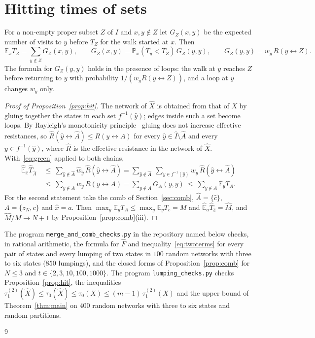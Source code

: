 \documentclass[11pt]{amsart}
\theoremstyle{definition}
\newcommand{\Prob}{\mathbb{P}}
\newcommand{\E}{\mathbb{E}}
\newcommand{\tmix}{\tau_1^{(2)}}
\newcommand{\hE}{\widehat{\E}}
\newcommand{\hw}{\widehat{w}}
\newcommand{\hI}{\widehat{I}}
\newcommand{\hA}{\widehat{A}}
\newcommand{\hX}{\widehat{X}}
\newcommand{\hM}{\widehat{M}}
\newcommand{\hF}{\widehat{F}}
\newcommand{\lra}{\leftrightarrow}
\begin{document}
\section{Hitting times of sets}\label{sec:hit}
For a non-empty proper subset $Z$ of $I$ and $x,y\notin Z$ let $G_Z(x,y)$ be the expected number of visits to $y$
before $T_Z$ for the walk started at $x$. Then~\cite[Section~2.2]{LP}
\begin{equation}\label{eq:green}
\E_xT_Z=\sum_{y\notin Z}G_Z(x,y),\qquad G_Z(x,y)=\Prob_x(T_y<T_Z)\,G_Z(y,y),\qquad G_Z(y,y)=w_y\,R(y\lra Z).
\end{equation}
The formula for $G_Z(y,y)$ holds in the presence of loops: the walk at $y$ reaches $Z$ before returning to $y$ with
probability $1/(w_yR(y\lra Z))$, and a loop at $y$ changes $w_y$ only.

\begin{proof}[Proof of Proposition~\ref{prop:hit}]
The network of $\hX$ is obtained from that of $X$ by gluing together the states in each set $f^{-1}(\hat y)$; edges
inside such a set become loops. By Rayleigh's monotonicity principle~\cite[Section~2.4]{LP} gluing does not increase
effective resistances, so $\widehat{R}(\hat y\lra\hA)\le R(y\lra A)$ for every $\hat y\in\hI\setminus\hA$ and every
$y\in f^{-1}(\hat y)$, where $\widehat R$ is the effective resistance in the network of $\hX$. With~\eqref{eq:green}
applied to both chains,
\begin{align*}
\hE_{\hat x}\widehat{T}_{\hA}\ &\le\ \sum_{\hat y\notin\hA}\hw_{\hat y}\,\widehat{R}(\hat y\lra\hA)
=\sum_{\hat y\notin\hA}\ \sum_{y\in f^{-1}(\hat y)}w_y\,\widehat{R}(\hat y\lra\hA)\\
&\le\ \sum_{y\notin A}w_y\,R(y\lra A)=\sum_{y\notin A}G_A(y,y)\ \le\ \sum_{y\notin A}\E_yT_A .
\end{align*}
For the second statement take the comb of Section~\ref{sec:comb}, $\hA=\{\hat c\}$, $A=\{z_N,c\}$ and $\hat x=a$.
Then $\max_y\E_yT_A\le\max_y\E_yT_c=M$ and $\hE_a\widehat T_{\hat c}=\hM$, and $\hM/M\to N+1$ by
Proposition~\ref{prop:comb}(iii).
\end{proof}

The program \texttt{merge\_and\_comb\_checks.py} in the repository named below checks, in rational arithmetic, the
formula for $\hF$ and inequality~\eqref{eq:twoterms} for every pair of states and every lumping of two states in $100$
random networks with three to six states ($850$ lumpings), and the closed forms of Proposition~\ref{prop:comb} for
$N\le3$ and $t\in\{2,3,10,100,1000\}$. The program \texttt{lumping\_checks.py} checks Proposition~\ref{prop:hit},
the inequalities $\tmix(\hX)\le\tau_0(\hX)\le\tau_0(X)\le(m-1)\,\tmix(X)$ and the upper bound of
Theorem~\ref{thm:main} on $400$ random networks with three to six states and random partitions.



\appendix


\begin{thebibliography}{9}


\end{thebibliography}
\end{document}
